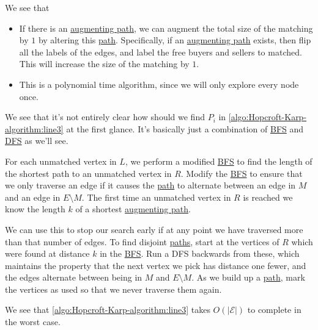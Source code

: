 \begin{intuition}
	We see that
	\begin{itemize}
		\item If there is an \hyperref[def:augmenting-path]{augmenting path}, we can augment the total size of the matching by \(1\) by altering this \hyperref[def:path]{path}. Specifically, if an \hyperref[def:augmenting-path]{augmenting path} exists, then flip all the labels of the edges, and label the free buyers and sellers to matched. This will increase the size of the matching by \(1\).
		\item This is a polynomial time algorithm, since we will only explore every node once.
	\end{itemize}
\end{intuition}

\begin{remark}\label{rmk:lec25-1}
	We see that it's not entirely clear how should we find \(P_i\) in \autoref{algo:Hopcroft-Karp-algorithm:line3} at the first glance. It's basically just a combination of \hyperref[algo:BFS]{BFS} and \hyperref[rmk:DFS]{DFS} as we'll see.
\end{remark}
\begin{explanation}
	For each unmatched vertex in \(L\), we perform a modified \hyperref[algo:BFS]{BFS} to find the length of the shortest path to an unmatched vertex in \(R\). Modify the \hyperref[algo:BFS]{BFS} to ensure that we only traverse an edge if it causes the \hyperref[def:path]{path} to alternate between an edge in \(M\) and an edge in \(E\setminus M\). The first time an unmatched vertex in \(R\) is reached we know the length \(k\) of a shortest \hyperref[def:augmenting-path]{augmenting path}.

	We can use this to stop our search early if at any point we have traversed more than that number of edges. To find disjoint \hyperref[def:path]{paths}, start at the vertices of \(R\) which were found at distance \(k\) in the \hyperref[algo:BFS]{BFS}. Run a DFS backwards from these, which maintains the property that the next vertex we pick has distance one fewer, and the edges alternate between being in \(M\) and \(E\setminus M\). As we build up a \hyperref[def:path]{path}, mark the vertices as used so that we never traverse them again.
\end{explanation}

\begin{remark}
	We see that \autoref{algo:Hopcroft-Karp-algorithm:line3} takes \(O(\left\vert \mathcal{E} \right\vert )\) to complete in the worst case.
\end{remark}


